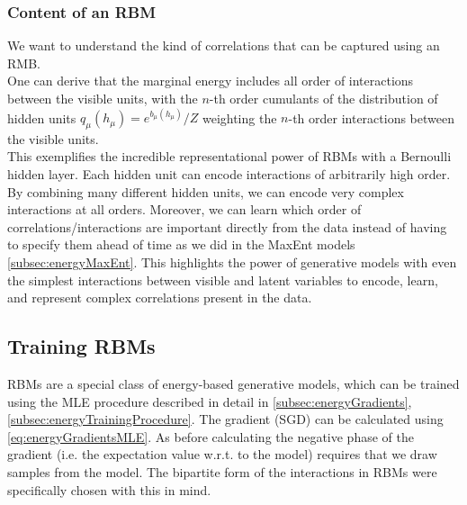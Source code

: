 \subsubsection{Content of an RBM}
We want to understand the kind of correlations that can be captured using an RMB.\\
One can derive that the marginal energy includes all order of interactions between the visible units, with the $n$-th order cumulants of the distribution of hidden units $q_\mu(h_\mu) = e^{b_\mu(h_\mu)}/Z$ weighting the $n$-th order interactions between the visible units.\\
This exemplifies the incredible representational power of RBMs with a Bernoulli hidden layer. Each hidden unit can encode interactions of arbitrarily high order. By combining many different hidden units, we can encode very complex interactions at all orders. Moreover, we can learn which order of correlations/interactions are important directly from the data instead of having to specify them ahead of time as we did in the MaxEnt models \ref{subsec:energyMaxEnt}. This highlights the power of generative models with even the simplest interactions between visible and latent variables to encode, learn, and represent complex correlations present in the data.



\subsection{Training RBMs}
\label{subsec:deepGenerativeTraining}
RBMs are a special class of energy-based generative models, which can be trained using the MLE procedure described in detail in \ref{subsec:energyGradients},\ref{subsec:energyTrainingProcedure}. The gradient (SGD) can be calculated using \ref{eq:energyGradientsMLE}. As before calculating the negative phase of the gradient (i.e. the expectation value w.r.t. to the model) requires that we draw samples from the model. The bipartite form of the interactions in RBMs were specifically chosen with this in mind.

